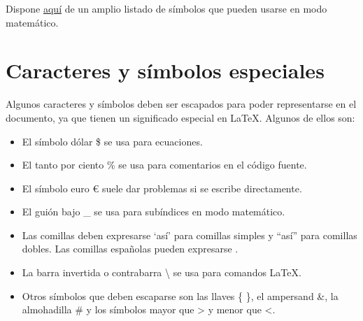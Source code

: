 Dispone \href{http://www.yann-ollivier.org/latex/texsymbols.pdf}{aquí} de un amplio listado de símbolos que pueden usarse en modo matemático.

\section{Caracteres y símbolos especiales}
Algunos caracteres y símbolos deben ser escapados para poder representarse en el documento, ya que tienen un significado especial en LaTeX. Algunos de ellos son:

\begin{itemize}
    \item El símbolo dólar \$ se usa para ecuaciones.
    \item El tanto por ciento \% se usa para comentarios en el código fuente.
    \item El símbolo euro \euro{} suele dar problemas si se escribe directamente.
    \item El guión bajo \_ se usa para subíndices en modo matemático.
    \item Las comillas deben expresarse `así' para comillas simples y ``así'' para comillas dobles. Las comillas españolas pueden expresarse .
    \item La barra invertida o contrabarra \textbackslash{} se usa para comandos LaTeX.
    \item Otros símbolos que deben escaparse son las llaves \{ \}, el ampersand \&, la almohadilla \# y los símbolos mayor que \textgreater{} y menor que \textless{}.
\end{itemize}